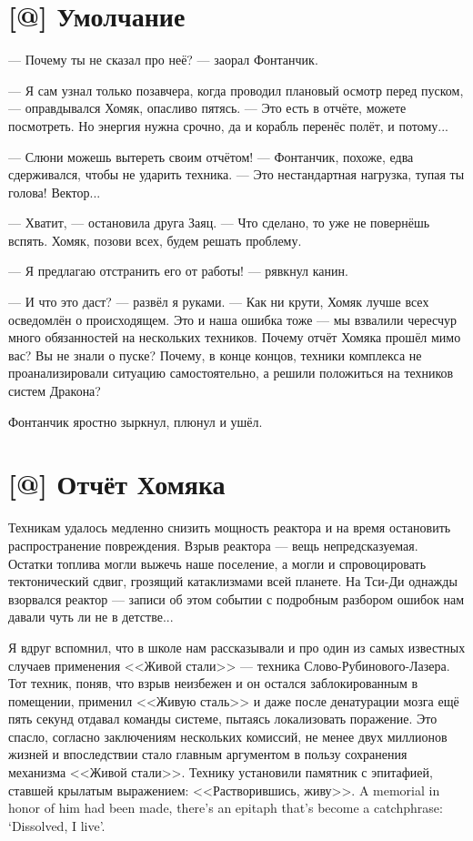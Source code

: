 \section{[@] Умолчание}

\textspace

--- Почему ты не сказал про неё? --- заорал Фонтанчик.

--- Я сам узнал только позавчера, когда проводил плановый осмотр перед пуском, --- оправдывался Хомяк, опасливо пятясь.
--- Это есть в отчёте, можете посмотреть.
Но энергия нужна срочно, да и корабль перенёс полёт, и потому...

--- Слюни можешь вытереть своим отчётом! --- Фонтанчик, похоже, едва сдерживался, чтобы не ударить техника.
--- Это нестандартная нагрузка, тупая ты голова!
Вектор...

--- Хватит, --- остановила друга Заяц.
--- Что сделано, то уже не повернёшь вспять.
Хомяк, позови всех, будем решать проблему.

--- Я предлагаю отстранить его от работы! --- рявкнул канин.

--- И что это даст? --- развёл я руками.
--- Как ни крути, Хомяк лучше всех осведомлён о происходящем.
Это и наша ошибка тоже --- мы взвалили чересчур много обязанностей на нескольких техников.
Почему отчёт Хомяка прошёл мимо вас?
Вы не знали о пуске?
Почему, в конце концов, техники комплекса не проанализировали ситуацию самостоятельно, а решили положиться на техников систем Дракона?

Фонтанчик яростно зыркнул, плюнул и ушёл.

\section{[@] Отчёт Хомяка}

Техникам удалось медленно снизить мощность реактора и на время остановить распространение повреждения.
Взрыв реактора --- вещь непредсказуемая.
Остатки топлива могли выжечь наше поселение, а могли и спровоцировать тектонический сдвиг, грозящий катаклизмами всей планете.
На Тси-Ди однажды взорвался реактор --- записи об этом событии с подробным разбором ошибок нам давали чуть ли не в детстве...

Я вдруг вспомнил, что в школе нам рассказывали и про один из самых известных случаев применения <<Живой стали>> --- техника Слово-Рубинового-Лазера.
Тот техник, поняв, что взрыв неизбежен и он остался заблокированным в помещении, применил <<Живую сталь>> и даже после денатурации мозга ещё пять секунд отдавал команды системе, пытаясь локализовать поражение.
Это спасло, согласно заключениям нескольких комиссий, не менее двух миллионов жизней и впоследствии стало главным аргументом в пользу сохранения механизма <<Живой стали>>.
{Технику установили памятник с эпитафией, ставшей крылатым выражением: <<Растворившись, живу>>.}
{A memorial in honor of him had been made, there's an epitaph that's become a catchphrase: `Dissolved, I live'.}

